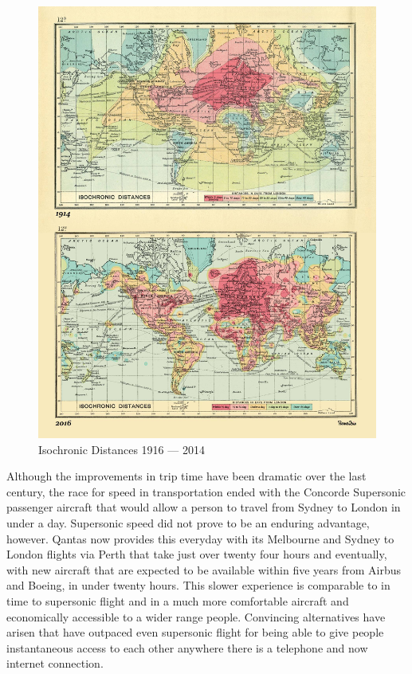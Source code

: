 \begin{figure}
\centering
\includegraphics[scale=0.25]{figures/IsochronicDistancesRome2Rio.jpg}
\caption{Isochronic Distances 1916 --- 2014\cite{RefWorks:315}}
\end{figure}


Although the improvements in trip time have been dramatic over the last century, the race for speed in transportation ended with the Concorde Supersonic passenger aircraft that would allow a person to travel from Sydney to London in under a day. Supersonic speed did not prove to be an enduring advantage, however. Qantas now provides this everyday with its Melbourne and Sydney to London flights via Perth that take just over twenty four hours and eventually, with new aircraft that are expected to be available within five years from Airbus and Boeing, in under twenty hours. This slower experience is comparable to in time to supersonic flight and in a much more comfortable aircraft and economically accessible to a wider range people\cite{RefWorks:317}. Convincing alternatives have arisen that have outpaced even supersonic flight for being able to give people instantaneous access to each other anywhere there is a telephone and now internet connection.

